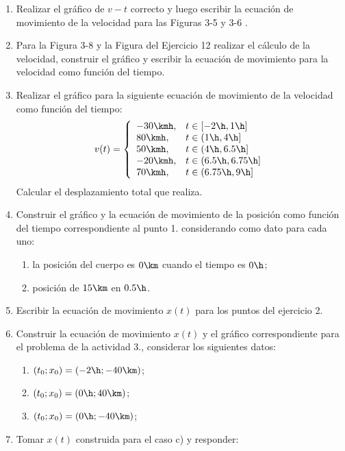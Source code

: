 \begin{enumerate}
  \item Realizar el gráfico de $v-t$ correcto y luego escribir la ecuación de
    movimiento de la velocidad para las Figuras 3-5 y 3-6
    \parencite[65]{alvarenga}.
  \item Para la Figura 3-8 y la Figura del Ejercicio 12
    \parencite[68]{alvarenga} realizar el cálculo de la velocidad, construir el
    gráfico y escribir la ecuación de movimiento para la velocidad como función
    del tiempo.
  \item Realizar el gráfico para la siguiente ecuación de movimiento de la
    velocidad como función del tiempo:
    \[ v(t) = \left\{
      \begin{array}{ll}
	-30\kmh, & t \in [-2\h,1\h] \\
	80\kmh, & t \in (1\h,4\h] \\
	50\kmh, & t \in (4\h,6.5\h] \\
	-20\kmh, & t \in (6.5\h,6.75\h] \\
	70\kmh, & t \in (6.75\h,9\h] \\
      \end{array}
      \right.
    \]
    Calcular el desplazamiento total que realiza.
    \item Construir el gráfico y la ecuación de movimiento de la posición como
    función del tiempo correspondiente al punto 1. considerando como dato para
    cada uno:
    \begin{enumerate}
      \item la posición del cuerpo es $0\km$ cuando el tiempo es $0\h$;
      \item posición de $15\km$ en $0.5\h$.
    \end{enumerate}
  \item Escribir la ecuación de movimiento $x(t)$ para los puntos del ejercicio
    2.
  \item Construir la ecuación de movimiento $x(t)$ y el gráfico correspondiente
    para el problema de la actividad 3., considerar los siguientes datos:
    \begin{enumerate}
      \item $(t_0;x_0)=(-2\h;-40\km)$;
      \item $(t_0;x_0)=(0\h;40\km)$;
      \item $(t_0;x_0)=(0\h;-40\km)$;
    \end{enumerate}
  \item Tomar $x(t)$ construida para el caso c) y responder:
    \begin{enumerate}

\end{enumerate}
\end{enumerate}
